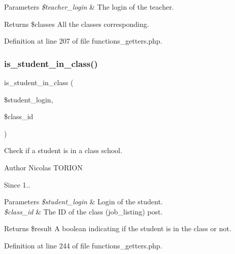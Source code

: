 \begin{DoxyParams}{Parameters}
{\em \$teacher\+\_\+login} & The login of the teacher. \\
\hline
\end{DoxyParams}
\begin{DoxyReturn}{Returns}
\$classes All the classes corresponding. 
\end{DoxyReturn}


Definition at line 207 of file functions\+\_\+getters.\+php.

\mbox{\label{functions__getters_8php_ad7b9531b5adf7e3fd2fbbdabc9e15ebb}} 
\subsubsection{\texorpdfstring{is\+\_\+student\+\_\+in\+\_\+class()}{is\_student\_in\_class()}}
{\footnotesize\ttfamily is\+\_\+student\+\_\+in\+\_\+class (\begin{DoxyParamCaption}\item[{}]{\$student\+\_\+login,  }\item[{}]{\$class\+\_\+id }\end{DoxyParamCaption})}

Check if a student is in a class school.

\begin{DoxyAuthor}{Author}
Nicolas T\+O\+R\+I\+ON 
\end{DoxyAuthor}
\begin{DoxySince}{Since}
1.. 
\end{DoxySince}

\begin{DoxyParams}{Parameters}
{\em \$student\+\_\+login} & Login of the student. \\
\hline
{\em \$class\+\_\+id} & The ID of the class (job\+\_\+listing) post. \\
\hline
\end{DoxyParams}
\begin{DoxyReturn}{Returns}
\$result A boolean indicating if the student is in the class or not. 
\end{DoxyReturn}


Definition at line 244 of file functions\+\_\+getters.\+php.

